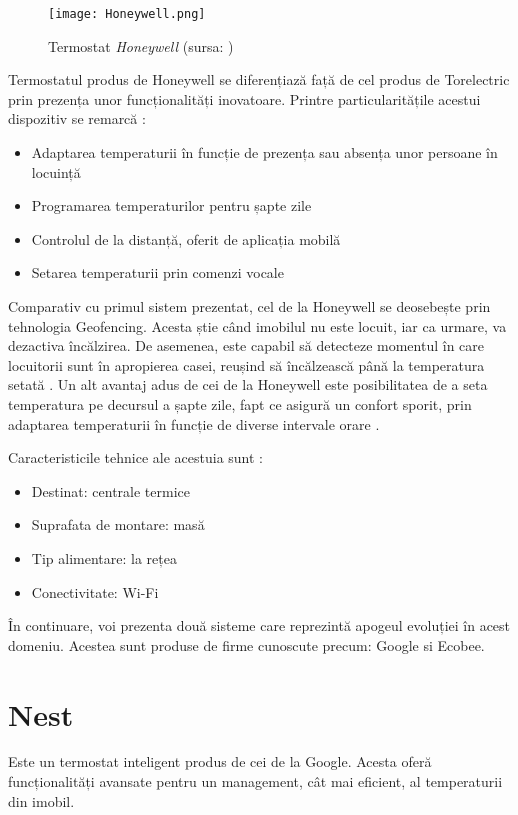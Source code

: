 \begin{wrapfigure}{l}{0.55\textwidth} 
	\centering
	\texttt{[image: Honeywell.png]}
	\caption{Termostat \textit{Honeywell} (sursa: \cite{honeywell})}
\end{wrapfigure}

	Termostatul produs de Honeywell se diferențiază față de cel produs de Torelectric prin prezența unor funcționalități inovatoare. Printre particularitățile acestui dispozitiv se remarcă \cite{honeywell}:
	\begin{itemize}
	\setlength{\itemindent}{2em}
		\itemsep0em
		\item Adaptarea temperaturii în funcție de prezența sau absența unor persoane în locuință 
		\item Programarea temperaturilor pentru șapte zile
		\item Controlul de la distanță, oferit de aplicația mobilă
		\item Setarea temperaturii prin comenzi vocale
	\end{itemize}

	Comparativ cu primul sistem prezentat, cel de la Honeywell se deosebește prin tehnologia Geofencing. Acesta știe când imobilul nu este locuit, iar ca urmare, va dezactiva încălzirea. De asemenea, este capabil să detecteze momentul în care locuitorii sunt în apropierea casei, reușind să încălzească până la temperatura setată \cite{honeywell}.
	Un alt avantaj adus de cei de la Honeywell este posibilitatea de a seta temperatura pe decursul a șapte zile, fapt ce asigură un confort sporit, prin adaptarea temperaturii în funcție de diverse intervale orare \cite{honeywell}.

	Caracteristicile tehnice ale acestuia sunt \cite{honeywell}:
	\begin{itemize}
	\setlength{\itemindent}{2em}
		\itemsep0em
		\item Destinat: centrale termice
		\item Suprafata de montare: masă
		\item Tip alimentare: la rețea
		\item Conectivitate: Wi-Fi
	\end{itemize}

	În continuare, voi prezenta două sisteme care reprezintă apogeul evoluției în acest domeniu. Acestea sunt produse de firme cunoscute precum: Google si Ecobee.

\section{Nest}
	Este un termostat inteligent produs de cei de la Google. Acesta oferă funcționalități avansate pentru un management, cât mai eficient, al temperaturii din imobil. 

